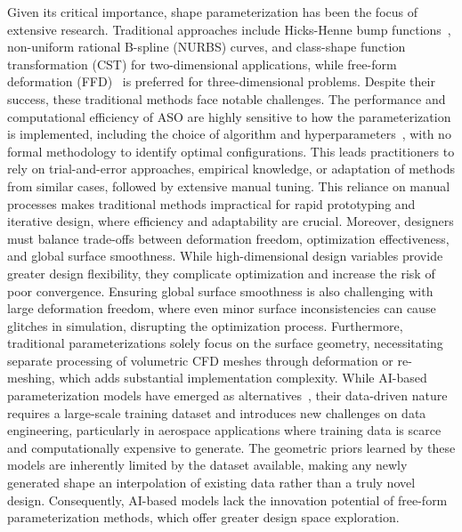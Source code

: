 Given its critical importance, shape parameterization has been the focus of extensive research. Traditional approaches include Hicks-Henne bump functions~\cite{aa.Hicks1978}, non-uniform rational B-spline (NURBS) curves, and class-shape function transformation (CST)\cite{aa.Kulfan2008} for two-dimensional applications, while free-form deformation (FFD)~\cite{aa.Sederberg1986, aa.Lamousin1994, aa.Kenway2010} is preferred for three-dimensional problems. Despite their success, these traditional methods face notable challenges. The performance and computational efficiency of ASO are highly sensitive to how the parameterization is implemented, including the choice of algorithm and hyperparameters~\cite{aa.Masters2017,aa.Vuruskan2019,aa.Song2004}, with no formal methodology to identify optimal configurations. This leads practitioners to rely on trial-and-error approaches, empirical knowledge, or adaptation of methods from similar cases, followed by extensive manual tuning. This reliance on manual processes makes traditional methods impractical for rapid prototyping and iterative design, where efficiency and adaptability are crucial. Moreover, designers must balance trade-offs between deformation freedom, optimization effectiveness, and global surface smoothness. While high-dimensional design variables provide greater design flexibility, they complicate optimization and increase the risk of poor convergence. Ensuring global surface smoothness is also challenging with large deformation freedom, where even minor surface inconsistencies can cause glitches in simulation, disrupting the optimization process.
Furthermore, traditional parameterizations solely focus on the surface geometry, necessitating separate processing of volumetric CFD meshes through deformation or re-meshing, which adds substantial implementation complexity. While AI-based parameterization models have emerged as alternatives~\cite{aa.Bamford2024,aa.Swannet2024,aa.Secchi2024}, their data-driven nature requires a large-scale training dataset and introduces new challenges on data engineering, particularly in aerospace applications where training data is scarce and computationally expensive to generate. The geometric priors learned by these models are inherently limited by the dataset available, making any newly generated shape an interpolation of existing data rather than a truly novel design. Consequently, AI-based models lack the innovation potential of free-form parameterization methods, which offer greater design space exploration.

